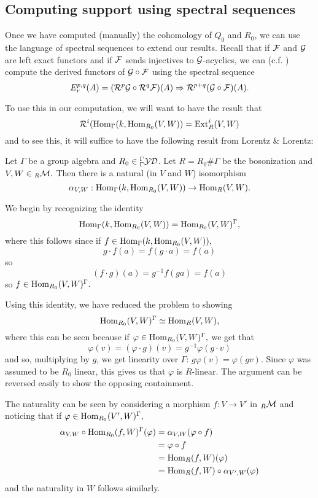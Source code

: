 \documentclass [11pt, proquest] {uwthesis}[2020/02/24]
\begin{document}
\subsection{Computing support using spectral sequences}\label{sec:spectral-seq}
    Once we have computed (manually) the cohomology of $Q_0$ and $R_0$, we can use the language of spectral sequences to extend our results. Recall that if $\mathcal{F}$ and $\mathcal{G}$ are left exact functors and if $\mathcal{F}$ sends injectives to $\mathcal{G}$-acyclics, we can (c.f. \cite[\S 5.8]{weibel}) compute the derived functors of $\mathcal{G}\circ\mathcal{F}$ using the spectral sequence
    \[E_r^{p,q}(A)=(\mathcal{R}^p\mathcal{G}\circ \mathcal{R}^q\mathcal{F})(A)\Rightarrow \mathcal{R}^{p+q}(\mathcal{G}\circ\mathcal{F})(A).\]
    
    
    To use this in our computation, we will want to have the result that
    \[\mathcal{R}^i(\operatorname{Hom}_\Gamma(k,\operatorname{Hom}_{R_0}(V,W))=\operatorname{Ext}^i_R(V,W)\]
    and to see this, it will suffice to have the following result from Lorentz \& Lorentz:
    \begin{lem}\label{lem:natural-iso}
        Let $\Gamma$ be a group algebra and $R_0\in{^\Gamma_\Gamma\mathcal{YD}}$. Let $R=R_0\#\Gamma$ be the bosonization and $V,W\in{_R\mathcal{M}}.$ Then there is a natural (in $V$ and $W$) isomorphism
        \[\alpha_{V,W}:\operatorname{Hom}_\Gamma(k,\operatorname{Hom}_{R_0}(V,W))\to\operatorname{Hom}_R(V,W).\]
    \end{lem}
    \begin{prf}
        We begin by recognizing the identity
        \[\operatorname{Hom}_\Gamma(k,\operatorname{Hom}_{R_0}(V,W))=\operatorname{Hom}_{R_0}(V,W)^\Gamma,\]
        where this follows since if $f\in \operatorname{Hom}_\Gamma(k,\operatorname{Hom}_{R_0}(V,W)),$
        \[g\cdot f(a)=f(g\cdot a)=f(a)\]
        so 
        \[(f\cdot g)(a)=g^{-1}f(ga)=f(a)\]
        so $f\in\operatorname{Hom}_{R_0}(V,W)^\Gamma.$
        
        Using this identity, we have reduced the problem to showing
        \[\operatorname{Hom}_{R_0}(V,W)^\Gamma\simeq \operatorname{Hom}_R(V,W),\]
        where this can be seen because if $\varphi\in\operatorname{Hom}_{R_0}(V,W)^\Gamma,$ we get that 
        \[\varphi(v)=(\varphi\cdot g)(v)=g^{-1}\varphi(g\cdot v)\]
        and so, multiplying by $g$, we get linearity over $\Gamma$: $g\varphi(v)=\varphi(gv).$ Since $\varphi$ was assumed to be $R_0$ linear, this gives us that $\varphi$ is $R$-linear. The argument can be reversed easily to show the opposing containment.
        
        The naturality can be seen by considering a morphism $f:V\to V'$ in $_R\mathcal{M}$ and noticing that if $\varphi\in\operatorname{Hom}_{R_0}(V',W)^\Gamma,$
        \begin{align*}
            \alpha_{V,W}\circ\operatorname{Hom}_{R_0}(f,W)^\Gamma(\varphi)&=\alpha_{V,W}(\varphi\circ f)\\
            &=\varphi\circ f\\
            &=\operatorname{Hom}_R(f,W)(\varphi)\\
            &=\operatorname{Hom}_R(f,W)\circ\alpha_{V',W}(\varphi)
        \end{align*}
        and the naturality in $W$ follows similarly.
    \end{prf}
    
\end{document}

